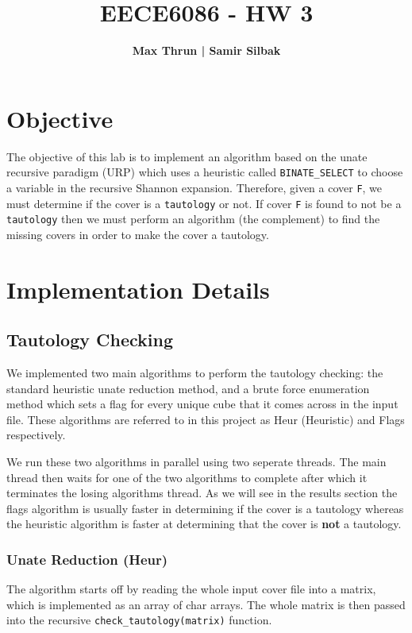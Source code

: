 \documentclass[10pt]{article}
\title{
    \vspace{2in}
    \textmd{\textbf{EECE6086 - HW 3}}\\
    \vspace{4in}
}
\author{\textbf{Max Thrun | Samir Silbak}}
\begin{document}
\maketitle
\newpage
\section{Objective}
The objective of this lab is to implement an algorithm based on the unate
recursive paradigm (URP) which uses a heuristic called \texttt{BINATE\_SELECT}
to choose a variable in the recursive Shannon expansion. Therefore, given a
cover \texttt{F}, we must determine if the cover is a \texttt{tautology} or
not. If cover \texttt{F} is found to not be a \texttt{tautology} then we must
perform an algorithm (the complement) to find the missing covers in order to
make the cover a tautology.

\section{Implementation Details}

    \subsection{Tautology Checking}

        We implemented two main algorithms to perform the tautology checking:
        the standard heuristic unate reduction method, and a brute force
        enumeration method which sets a flag for every unique cube that it
        comes across in the input file. These algorithms are referred to in
        this project as Heur (Heuristic) and Flags respectively.

        We run these two algorithms in parallel using two seperate threads. The
        main thread then waits for one of the two algorithms to complete after
        which it terminates the losing algorithms thread. As we will see in the
        results section the flags algorithm is usually faster in determining if
        the cover is a tautology whereas the heuristic algorithm is faster at
        determining that the cover is \textbf{not} a tautology.


        \subsubsection{Unate Reduction (Heur)}

        The algorithm starts off by reading the whole input cover file into a
        matrix, which is implemented as an array of char arrays. The whole
        matrix is then passed into the recursive
        \texttt{check\_tautology(matrix)} function.
\end{document}
